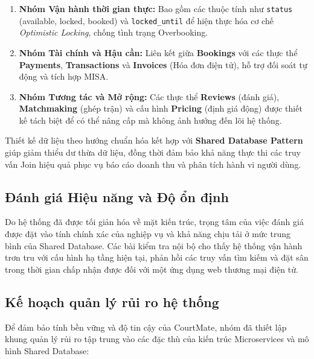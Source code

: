 \begin{enumerate}
    \item \textbf{Nhóm Vận hành thời gian thực:} Bao gồm các thuộc tính như \texttt{status} (available, locked, booked) và \texttt{locked\_until} để hiện thực hóa cơ chế \textit{Optimistic Locking}, chống tình trạng Overbooking.
    \item \textbf{Nhóm Tài chính và Hậu cần:} Liên kết giữa \textbf{Bookings} với các thực thể \textbf{Payments}, \textbf{Transactions} và \textbf{Invoices} (Hóa đơn điện tử), hỗ trợ đối soát tự động và tích hợp MISA.
    \item \textbf{Nhóm Tương tác và Mở rộng:} Các thực thể \textbf{Reviews} (đánh giá), \textbf{Matchmaking} (ghép trận) và cấu hình \textbf{Pricing} (định giá động) được thiết kế tách biệt để có thể nâng cấp mà không ảnh hưởng đến lõi hệ thống.
\end{enumerate}

Thiết kế dữ liệu theo hướng chuẩn hóa kết hợp với \textbf{Shared Database Pattern} giúp giảm thiểu dư thừa dữ liệu, đồng thời đảm bảo khả năng thực thi các truy vấn Join hiệu quả phục vụ báo cáo doanh thu và phân tích hành vi người dùng.

\subsection{Đánh giá Hiệu năng và Độ ổn định}
Do hệ thống đã được tối giản hóa về mặt kiến trúc, trọng tâm của việc đánh giá được đặt vào tính chính xác của nghiệp vụ và khả năng chịu tải ở mức trung bình của Shared Database. Các bài kiểm tra nội bộ cho thấy hệ thống vận hành trơn tru với cấu hình hạ tầng hiện tại, phản hồi các truy vấn tìm kiếm và đặt sân trong thời gian chấp nhận được đối với một ứng dụng web thương mại điện tử.

\subsection{Kế hoạch quản lý rủi ro hệ thống}
Để đảm bảo tính bền vững và độ tin cậy của CourtMate, nhóm đã thiết lập khung quản lý rủi ro tập trung vào các đặc thù của kiến trúc Microservices và mô hình Shared Database:

